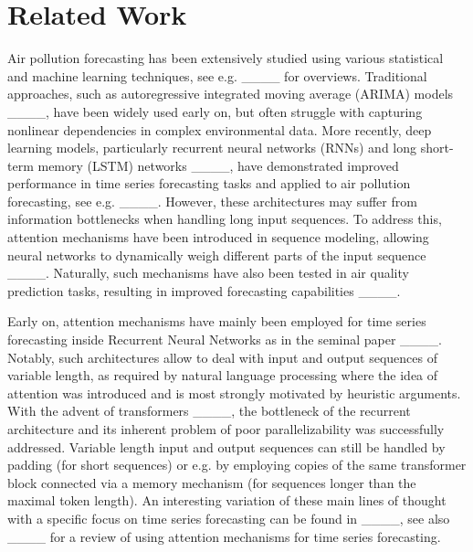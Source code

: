 \section{Related Work}
\label{sec:related_work}
Air pollution forecasting has been extensively studied using various statistical and machine learning techniques, see e.g. ____ for overviews. Traditional approaches, such as autoregressive integrated moving average (ARIMA) models ____, have been widely used early on, but often struggle with capturing nonlinear dependencies in complex environmental data. More recently, deep learning models, particularly recurrent neural networks (RNNs) and long short-term memory (LSTM) networks ____, have demonstrated improved performance in time series forecasting tasks and applied to air pollution forecasting, see e.g. ____. 
However, these architectures may suffer from information bottlenecks when handling long input sequences. To address this, attention mechanisms have been introduced in sequence modeling, allowing neural networks to dynamically weigh different parts of the input sequence ____. Naturally, such mechanisms have also been tested in air quality prediction tasks, resulting in improved forecasting capabilities ____.

Early on, attention mechanisms have mainly been employed for time series forecasting inside Recurrent Neural Networks as in the seminal paper ____. 
Notably, such architectures allow to deal with input and output sequences of variable length, as required by natural language processing where the idea of attention was introduced and is most strongly motivated by heuristic arguments. 
With the advent of transformers ____, the bottleneck of the recurrent architecture and its inherent problem of poor parallelizability was successfully addressed. Variable length input and output sequences can still be handled by padding (for short sequences) or e.g. by employing copies of the same transformer block connected via a memory mechanism (for sequences longer than the maximal token length). 
An interesting variation of these main lines of thought with a specific focus on time series forecasting can be found in ____, see also ____ for a review of using attention mechanisms for time series forecasting. 

